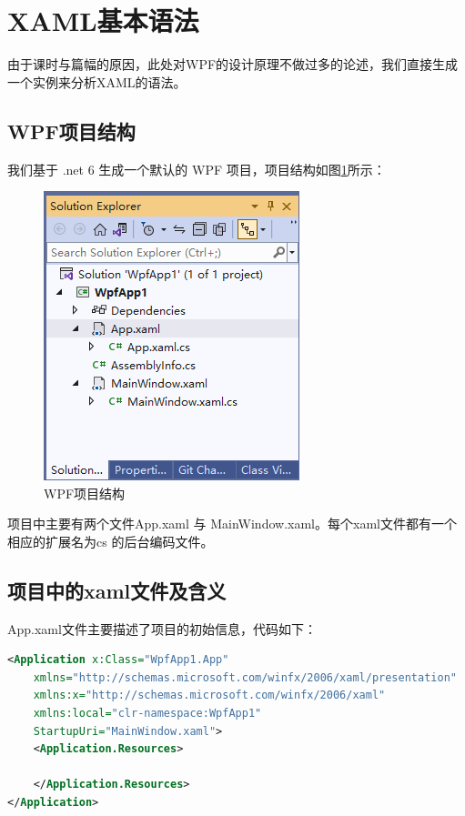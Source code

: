 \section{XAML基本语法}

由于课时与篇幅的原因，此处对WPF的设计原理不做过多的论述，我们直接生成一个实例来分析XAML的语法。

\subsection{WPF项目结构}
我们基于 .net 6 生成一个默认的 WPF 项目，项目结构如图\ref{fig:wpfsln}所示：

\begin{figure}[htbp]
    \centering
    \includegraphics[scale=1]{chapter/uibase/wpfsln.png}
    \caption{WPF项目结构}
    \label{fig:wpfsln}
\end{figure}

项目中主要有两个文件App.xaml 与 MainWindow.xaml。每个xaml文件都有一个相应的扩展名为cs
的后台编码文件。

\subsection{项目中的xaml文件及含义}
App.xaml文件主要描述了项目的初始信息，代码如下：
\begin{lstlisting}[language=xml]
<Application x:Class="WpfApp1.App"
    xmlns="http://schemas.microsoft.com/winfx/2006/xaml/presentation"
    xmlns:x="http://schemas.microsoft.com/winfx/2006/xaml"
    xmlns:local="clr-namespace:WpfApp1"
    StartupUri="MainWindow.xaml">
    <Application.Resources>
    
    </Application.Resources>
</Application>
\end{lstlisting}

